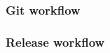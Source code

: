 
\begin{frame}
\frametitle{Git workflow}

\end{frame}

\begin{frame}
\frametitle{Release workflow}

\end{frame}

